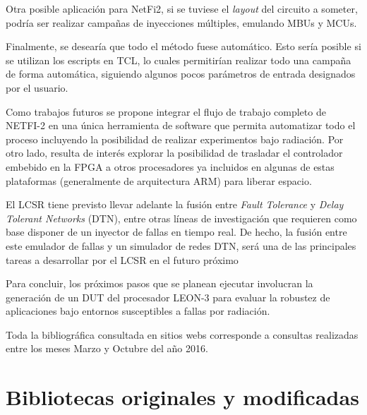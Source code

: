 \documentclass[a4paper,openright,12pt]{report}
\begin{document}
Otra posible aplicación  para NetFi2,  si se tuviese el \textit{layout} del circuito a someter, podría ser realizar campañas de inyecciones múltiples, emulando MBUs y MCUs.


Finalmente, se desearía que todo el método fuese automático. Esto sería posible si se utilizan los escripts en TCL, lo cuales permitirían realizar todo una campaña de forma automática, siguiendo algunos pocos parámetros de entrada designados por el usuario.





Como trabajos futuros se propone integrar el flujo de trabajo completo de NETFI-2 en una única herramienta de software que permita automatizar todo el proceso incluyendo la posibilidad de realizar experimentos bajo radiación. Por otro lado, resulta de interés explorar la posibilidad de trasladar el controlador embebido en la FPGA a otros procesadores ya incluidos en algunas de estas plataformas (generalmente de arquitectura ARM) para liberar espacio.


El LCSR  tiene previsto llevar adelante la fusión entre \textit{Fault Tolerance} y \textit{Delay Tolerant Networks} (DTN), entre otras líneas de investigación que requieren como base disponer de un inyector de fallas en tiempo real. De hecho, la fusión entre este emulador de fallas y un simulador de redes DTN, será una de las principales tareas a desarrollar por el LCSR en el futuro próximo

Para concluir, los próximos pasos que se planean ejecutar involucran la generación de un DUT del procesador LEON-3 para evaluar la robustez de aplicaciones bajo entornos susceptibles a fallas por radiación.

    




Toda la bibliográfica consultada en sitios webs corresponde a consultas realizadas entre los meses Marzo y Octubre del año 2016. 
\appendix
\chapter{Bibliotecas originales y modificadas }\label{aped.A}
\end{document}

